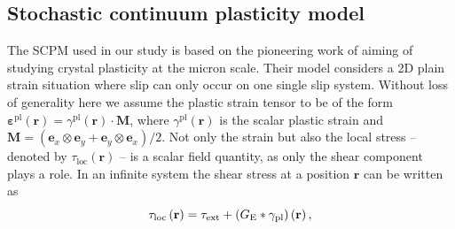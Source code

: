 \subsection{Stochastic continuum plasticity model} \label{sec:weakest_SCPM_description}
The SCPM used in our study is based on the pioneering work of \citet{1742-5468-2005-08-P08004} aiming of studying crystal plasticity at the micron scale. Their model considers a 2D plain strain situation where slip can only occur on one single slip system. Without loss of generality here we assume the plastic strain tensor to be of the form ${{\mathbf{\varepsilon }}^{{\text{pl}}}}\left( {\mathbf{r}} \right) = {\gamma ^{{\text{pl}}}}\left( {\mathbf{r}} \right) \cdot {\mathbf{M}}$, where ${\gamma ^{{\text{pl}}}}\left( {\mathbf{r}} \right)$ is the scalar plastic strain and ${\mathbf{M}} = \left( {{{\mathbf{e}}_x} \otimes {{\mathbf{e}}_y} + {{\mathbf{e}}_y} \otimes {{\mathbf{e}}_x}} \right)/2$. Not only the strain but also the local stress -- denoted by ${\tau _{{\text{loc}}}}\left( {\mathbf{r}} \right)$ -- is a scalar field quantity, as only the shear component plays a role.  In an infinite system the shear stress at a position $\mathbf{r}$ can be written as 
\begin{equation} \label{eq:weakest_tau_loc}
{\tau _{{\text{loc}}}}\left( {\mathbf{r}} \right) = {\tau _{{\text{ext}}}} + \left( {{G_{\rm{E}}} * {\gamma _{{\text{pl}}}}} \right)\left( {\mathbf{r}} \right),
\end{equation}
